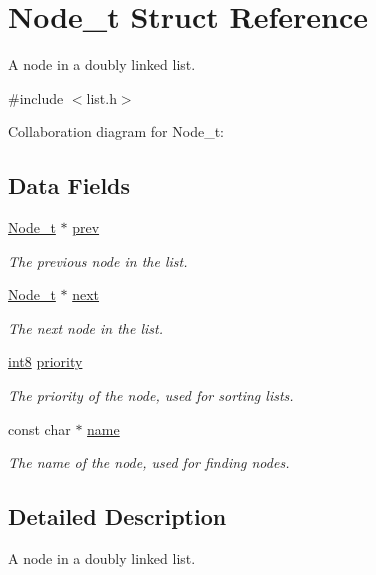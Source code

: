 \hypertarget{structNode__t}{\section{Node\+\_\+t Struct Reference}
\label{structNode__t}
}


A node in a doubly linked list.  




{\ttfamily \#include $<$list.\+h$>$}



Collaboration diagram for Node\+\_\+t\+:
\subsection*{Data Fields}
\begin{DoxyCompactItemize}
\item 
\hyperlink{structNode__t}{Node\+\_\+t} $\ast$ \hyperlink{structNode__t_ad75a52c8366f3dc84deb11268762472f}{prev}
\begin{DoxyCompactList}\small\item\em The previous node in the list. \end{DoxyCompactList}\item 
\hyperlink{structNode__t}{Node\+\_\+t} $\ast$ \hyperlink{structNode__t_aad52b1ee2ade4a4338147eea00037878}{next}
\begin{DoxyCompactList}\small\item\em The next node in the list. \end{DoxyCompactList}\item 
\hyperlink{type_8h_aa79c2d3de4fcd200458c406f40b2ae64}{int8} \hyperlink{structNode__t_ab051ee9099777b73f61535b154db369d}{priority}
\begin{DoxyCompactList}\small\item\em The priority of the node, used for sorting lists. \end{DoxyCompactList}\item 
const char $\ast$ \hyperlink{structNode__t_a599dccb2151a020f680b5f630b7c066b}{name}
\begin{DoxyCompactList}\small\item\em The name of the node, used for finding nodes. \end{DoxyCompactList}\end{DoxyCompactItemize}


\subsection{Detailed Description}
A node in a doubly linked list. 

